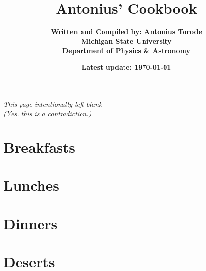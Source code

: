 \documentclass[a4paper,11pt]{book}
\title{{\huge \textbf{Antonius' Cookbook}} \\ \vspace{1cm}
}
\author{\textbf{Written and Compiled by: Antonius Torode} \\ \textbf{Michigan State University} \\ \textbf{Department of Physics \& Astronomy}}
\date{\textbf{Latest update: \today}}
\begin{document}
	
\AddToShipoutPicture*{\CoverPic}

\frontmatter
\clearpage
\maketitle

\tableofcontents
\newpage
\vspace*{\fill}
\begin{center}
	\textit{This page intentionally left blank. \\ (Yes, this is a contradiction.)}
\end{center}
\vspace*{\fill}

\mainmatter
\chapter{Breakfasts}


\chapter{Lunches}



\chapter{Dinners}


\chapter{Deserts}



\backmatter
\end{document}
